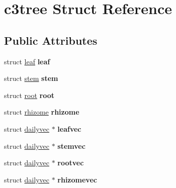 \hypertarget{structc3tree}{\section{c3tree Struct Reference}
\label{structc3tree}
}
\subsection*{Public Attributes}
\begin{DoxyCompactItemize}
\item 
\hypertarget{structc3tree_a527477c35d0c11eb8266e93146496af2}{struct \hyperlink{structleaf}{leaf} {\bfseries leaf}}\label{structc3tree_a527477c35d0c11eb8266e93146496af2}

\item 
\hypertarget{structc3tree_ae589cec8ee98c2601d0a54273a95337f}{struct \hyperlink{structstem}{stem} {\bfseries stem}}\label{structc3tree_ae589cec8ee98c2601d0a54273a95337f}

\item 
\hypertarget{structc3tree_a3e7f12cb7084256c48fde6b02be23435}{struct \hyperlink{structroot}{root} {\bfseries root}}\label{structc3tree_a3e7f12cb7084256c48fde6b02be23435}

\item 
\hypertarget{structc3tree_a0ce10bd7ee229f1976b8bf44ad8f8ead}{struct \hyperlink{structrhizome}{rhizome} {\bfseries rhizome}}\label{structc3tree_a0ce10bd7ee229f1976b8bf44ad8f8ead}

\item 
\hypertarget{structc3tree_ace932529cc34bd3185d8c1487523e204}{struct \hyperlink{structdailyvec}{dailyvec} $\ast$ {\bfseries leafvec}}\label{structc3tree_ace932529cc34bd3185d8c1487523e204}

\item 
\hypertarget{structc3tree_a8313b0495b8448511ec9fb1f7406f8bb}{struct \hyperlink{structdailyvec}{dailyvec} $\ast$ {\bfseries stemvec}}\label{structc3tree_a8313b0495b8448511ec9fb1f7406f8bb}

\item 
\hypertarget{structc3tree_a5f0c03d948d581a1929000139bce530b}{struct \hyperlink{structdailyvec}{dailyvec} $\ast$ {\bfseries rootvec}}\label{structc3tree_a5f0c03d948d581a1929000139bce530b}

\item 
\hypertarget{structc3tree_a83f47342f33fbf0cf8d00166403541af}{struct \hyperlink{structdailyvec}{dailyvec} $\ast$ {\bfseries rhizomevec}}\label{structc3tree_a83f47342f33fbf0cf8d00166403541af}


\end{DoxyCompactItemize}
